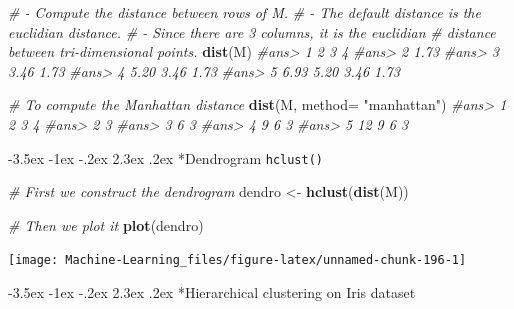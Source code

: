 \documentclass[]{book}
\makeatletter
\newenvironment{Shaded}{\begin{snugshade}}{\end{snugshade}}
\newcommand{\KeywordTok}[1]{\textcolor[rgb]{0.13,0.29,0.53}{\textbf{#1}}}
\newcommand{\DataTypeTok}[1]{\textcolor[rgb]{0.13,0.29,0.53}{#1}}
\newcommand{\StringTok}[1]{\textcolor[rgb]{0.31,0.60,0.02}{#1}}
\newcommand{\CommentTok}[1]{\textcolor[rgb]{0.56,0.35,0.01}{\textit{#1}}}
\newcommand{\NormalTok}[1]{#1}
\renewcommand\section{\@startsection {section}{1}{\z@}%
                                   {-3.5ex \@plus -1ex \@minus -.2ex}%
                                   {2.3ex \@plus.2ex}%
                                   {\normalfont\Large\bfseries\color{ForestGreen}}}
\theoremstyle{definition}
\theoremstyle{definition}
\theoremstyle{definition}
\theoremstyle{remark}
\makeatother
\begin{document}
\begin{Shaded}
\begin{Highlighting}[]
\CommentTok{# - Compute the distance between rows of M.}
\CommentTok{# - The default distance is the euclidian distance.}
\CommentTok{# - Since there are 3 columns, it is the euclidian}
\CommentTok{#        distance between tri-dimensional points.}
\KeywordTok{dist}\NormalTok{(M)}
\CommentTok{#ans>      1    2    3    4}
\CommentTok{#ans> 2 1.73               }
\CommentTok{#ans> 3 3.46 1.73          }
\CommentTok{#ans> 4 5.20 3.46 1.73     }
\CommentTok{#ans> 5 6.93 5.20 3.46 1.73}
\end{Highlighting}
\end{Shaded}

\begin{Shaded}
\begin{Highlighting}[]
\CommentTok{# To compute the Manhattan distance }
\KeywordTok{dist}\NormalTok{(M, }\DataTypeTok{method=} \StringTok{"manhattan"}\NormalTok{)}
\CommentTok{#ans>    1  2  3  4}
\CommentTok{#ans> 2  3         }
\CommentTok{#ans> 3  6  3      }
\CommentTok{#ans> 4  9  6  3   }
\CommentTok{#ans> 5 12  9  6  3}
\end{Highlighting}
\end{Shaded}

\section*{\texorpdfstring{Dendrogram
\texttt{hclust()}}{Dendrogram hclust()}}\label{dendrogram-hclust}

\begin{Shaded}
\begin{Highlighting}[]
\CommentTok{# First we construct the dendrogram }
\NormalTok{dendro <-}\StringTok{ }\KeywordTok{hclust}\NormalTok{(}\KeywordTok{dist}\NormalTok{(M))}

\CommentTok{# Then we plot it}
\KeywordTok{plot}\NormalTok{(dendro)}
\end{Highlighting}
\end{Shaded}

\begin{center}\texttt{[image: Machine-Learning\_files/figure-latex/unnamed-chunk-196-1]} \end{center}

\section*{Hierarchical clustering on Iris
dataset}\label{hierarchical-clustering-on-iris-dataset}
\end{document}

